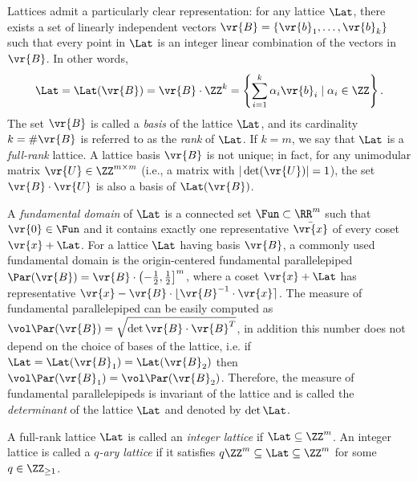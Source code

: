 \documentclass{fundam}
\begin{document}
Lattices admit a particularly clear representation: for any lattice $\Lat$, there exists a set of linearly independent vectors $\vr{B} = \{\vr{b}_1, \ldots, \vr{b}_k\}$ such that every point in $\Lat$ is an integer linear combination of the vectors in $\vr{B}$. In other words,
\begin{align*}
	\Lat = \Lat(\vr{B}) = \vr{B} \cdot \ZZ^k = \left\{ \sum_{i=1}^{k} \alpha_i \vr{b}_i \mid \alpha_i \in \ZZ \right\}.
\end{align*}
The set $\vr{B}$ is called a \textit{basis} of the lattice $\Lat$, and its cardinality $k = \#\vr{B}$ is referred to as the \textit{rank} of $\Lat$.  
If $k = m$, we say that $\Lat$ is a \textit{full-rank} lattice.  
A lattice basis $\vr{B}$ is not unique; in fact, for any unimodular matrix $\vr{U} \in \ZZ^{m \times m}$ (i.e., a matrix with $|\det(\vr{U})| = 1$), the set $\vr{B} \cdot \vr{U}$ is also a basis of $\Lat(\vr{B})$.


A \emph{fundamental domain} of $\Lat$ is a connected set $\Fun\subset \RR^{m}$ such that $\vr{0}\in\Fun$ and it contains exactly one representative $\bar{\vr{x}}$ of every coset $\vr{x}+\Lat$. For a lattice $\Lat$ having basis $\vr{B}$, a commonly used fundamental domain is the origin-centered fundamental parallelepiped $\Par(\vr{B}) = \vr{B}\cdot \left( -\frac{1}{2}, \frac{1}{2}  \right]^{m}$, where a coset $\vr{x}+\Lat$ has representative $\vr{x} - \vr{B}\cdot \lfloor \vr{B}^{-1}\cdot \vr{x}\rceil$. The measure of fundamental parallelepiped  can be easily computed as $\vol \Par(\vr{B}) = \sqrt{\det\vr{B}\cdot \vr{B}^{T}}$, in addition this number does not depend on the choice of bases of the lattice, i.e. if $\Lat = \Lat(\vr{B}_{1}) = \Lat(\vr{B}_{2})$ then $\vol \Par(\vr{B}_{1}) = \vol \Par(\vr{B}_{2})$. Therefore, the measure of fundamental parallelepipeds is invariant of the lattice and is called the \textit{determinant} of the lattice $\Lat$ and denoted by $\det\Lat$.

A full-rank lattice $\Lat$ is called an \textit{integer lattice} if $\Lat \subseteq \ZZ^m$. An integer lattice is called a \textit{$q$-ary lattice} if it satisfies $q\ZZ^m \subseteq \Lat \subseteq \ZZ^m$ for some $q \in \ZZ_{\geq 1}$.
\end{document}

